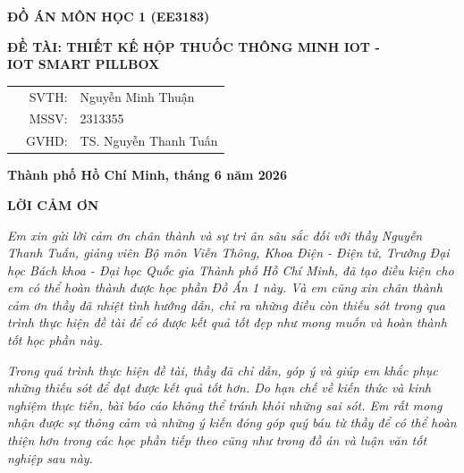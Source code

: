 \documentclass[12pt, a4paper, oneside]{article}
\begin{document}
\begin{titlepage}
\begin{center}
    \fontsize{18pt}{17pt}\selectfont 
    \textbf{ĐỒ ÁN MÔN HỌC 1 (EE3183)}
\end{center}
\begin{center}
    \fontsize{15pt}{17pt}\selectfont 
    \textbf{\textrm{ĐỀ TÀI: THIẾT KẾ HỘP THUỐC THÔNG MINH IOT - 
    \\
    IOT SMART PILLBOX}}
\end{center}

\begin{center}
    \vspace{15pt}
\end{center}

\vspace{10pt}

\begin{table}[h]
\begin{tabular}{rrl}
\hspace{6 cm} & SVTH: &Nguyễn Minh Thuận\\
& MSSV: &2313355\\
& GVHD: &TS. Nguyễn Thanh Tuấn
\end{tabular}
\end{table}
\vfill
\centerline{\bf Thành phố Hồ Chí Minh, tháng 6 năm 2026}

\vspace{1cm}
\end{titlepage}

\newpage

\newpage
\thispagestyle{empty}
\begin{center}
    \textbf{LỜI CẢM ƠN}
\end{center}

\textit{Em xin gửi lời cảm ơn chân thành và sự tri ân sâu sắc đối với thầy Nguyễn Thanh Tuấn, giảng viên Bộ môn Viễn Thông, Khoa Điện - Điện tử, Trường Đại học Bách khoa - Đại học Quốc gia Thành phố Hồ Chí Minh, đã tạo điều kiện cho em có thể hoàn thành được học phần Đồ Án 1 này. Và em cũng xin chân thành cảm ơn thầy đã nhiệt tình hướng dẫn, chỉ ra những điều còn thiếu sót trong qua trình thực hiện đề tài để có được kết quả tốt đẹp như mong muốn và hoàn thành tốt học phần này.}

\textit{Trong quá trình thực hiện đề tài, thầy đã chỉ dẫn, góp ý và giúp em khắc phục những thiếu sót để đạt được kết quả tốt hơn. Do hạn chế về kiến thức và kinh nghiệm thực tiễn, bài báo cáo không thể tránh khỏi những sai sót. Em rất mong nhận được sự thông cảm và những ý kiến đóng góp quý báu từ thầy để có thể hoàn thiện hơn trong các học phần tiếp theo cũng như trong đồ án và luận văn tốt nghiệp sau này.}
\end{document}
